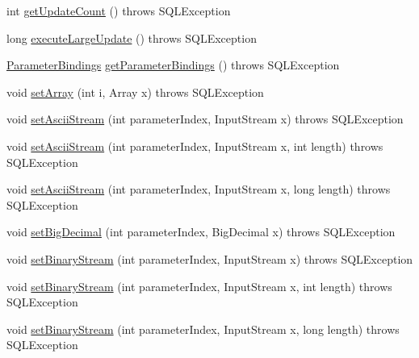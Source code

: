 \begin{DoxyCompactItemize}
int \mbox{\hyperlink{classcom_1_1mysql_1_1cj_1_1jdbc_1_1_client_prepared_statement_a9662d0cc90d1fe3aafc10b128162a8ed}{get\+Update\+Count}} ()  throws S\+Q\+L\+Exception 
\item 
long \mbox{\hyperlink{classcom_1_1mysql_1_1cj_1_1jdbc_1_1_client_prepared_statement_ab1ee808b8f013c4d5fed42413d32dea4}{execute\+Large\+Update}} ()  throws S\+Q\+L\+Exception 
\item 
\mbox{\hyperlink{interfacecom_1_1mysql_1_1cj_1_1jdbc_1_1_parameter_bindings}{Parameter\+Bindings}} \mbox{\hyperlink{classcom_1_1mysql_1_1cj_1_1jdbc_1_1_client_prepared_statement_ad99d10a1471bbf3f77e1b502cead7331}{get\+Parameter\+Bindings}} ()  throws S\+Q\+L\+Exception 
\item 
void \mbox{\hyperlink{classcom_1_1mysql_1_1cj_1_1jdbc_1_1_client_prepared_statement_a14fe19cb0e16a0829e5970728c3f025e}{set\+Array}} (int i, Array x)  throws S\+Q\+L\+Exception 
\item 
void \mbox{\hyperlink{classcom_1_1mysql_1_1cj_1_1jdbc_1_1_client_prepared_statement_a35fbcae6e35e8755c79a46754337c297}{set\+Ascii\+Stream}} (int parameter\+Index, Input\+Stream x)  throws S\+Q\+L\+Exception 
\item 
void \mbox{\hyperlink{classcom_1_1mysql_1_1cj_1_1jdbc_1_1_client_prepared_statement_afd89b596b5eab95ead48a3706b747cc2}{set\+Ascii\+Stream}} (int parameter\+Index, Input\+Stream x, int length)  throws S\+Q\+L\+Exception 
\item 
void \mbox{\hyperlink{classcom_1_1mysql_1_1cj_1_1jdbc_1_1_client_prepared_statement_a15235fb242787097c5685a9ec5cfb42a}{set\+Ascii\+Stream}} (int parameter\+Index, Input\+Stream x, long length)  throws S\+Q\+L\+Exception 
\item 
void \mbox{\hyperlink{classcom_1_1mysql_1_1cj_1_1jdbc_1_1_client_prepared_statement_aa69c4988a1606ee1891a85199449e3ca}{set\+Big\+Decimal}} (int parameter\+Index, Big\+Decimal x)  throws S\+Q\+L\+Exception 
\item 
void \mbox{\hyperlink{classcom_1_1mysql_1_1cj_1_1jdbc_1_1_client_prepared_statement_a29d1abb3aacb4e8e31bdfdf3684703e0}{set\+Binary\+Stream}} (int parameter\+Index, Input\+Stream x)  throws S\+Q\+L\+Exception 
\item 
void \mbox{\hyperlink{classcom_1_1mysql_1_1cj_1_1jdbc_1_1_client_prepared_statement_a3d140af9e31f60bb5dd494acfcd2b757}{set\+Binary\+Stream}} (int parameter\+Index, Input\+Stream x, int length)  throws S\+Q\+L\+Exception 
\item 
void \mbox{\hyperlink{classcom_1_1mysql_1_1cj_1_1jdbc_1_1_client_prepared_statement_a4cfe34988990d5fda641ebe59cc51880}{set\+Binary\+Stream}} (int parameter\+Index, Input\+Stream x, long length)  throws S\+Q\+L\+Exception 

\end{DoxyCompactItemize}
